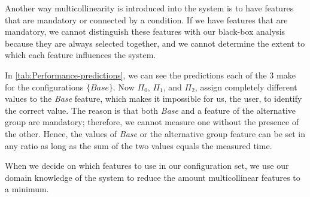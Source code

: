 Another way multicollinearity is introduced into the system is to have features that are mandatory or connected by a condition. 
If we have features that are mandatory, we cannot distinguish these features with our black-box analysis because they are always selected
together, and we cannot determine the extent to which each feature influences the system.~\cite{Multicollinearity}

In \autoref{tab:Performance-predictions}, we can see the predictions each of the 3 \perfInfluenceModel make for the configurations $\{Base\}$. 
Now $\Pi_0$, $\Pi_1$, and $\Pi_2$, assign completely different values to the \textit{Base} feature, which makes it impossible for us, the user,
to identify the correct value. The reason is that both \textit{Base} and a feature of the alternative group are mandatory; 
therefore, we cannot measure one without the presence of the other. 
Hence, the values of \textit{Base} or the alternative group feature can be set in any ratio as long as the sum of the two values equals the measured time.

When we decide on which features to use in our configuration set, we use our domain knowledge of the system to reduce the amount multicollinear
features to a minimum.

%
%
%



